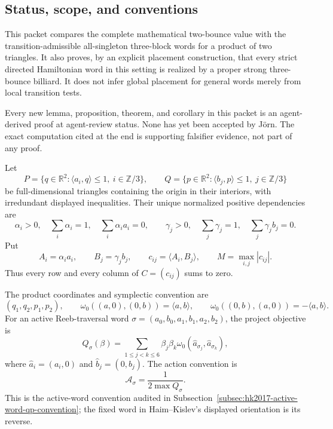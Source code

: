 %

\subsection{Status, scope, and conventions}
\label{subsec:product-triangle-bounce-status}

This packet compares the complete mathematical two-bounce value with the
transition-admissible all-singleton three-block words for a product of two
triangles.  It also proves, by an explicit placement construction, that every
strict directed Hamiltonian word in this setting is realized by a proper
strong three-bounce billiard.  It does not infer global placement for general
words merely from local transition tests.

\begin{unverified}
Every new lemma, proposition, theorem, and corollary in this packet is an
agent-derived proof at agent-review status.  None has yet been accepted by
Jörn.  The exact computation cited at the end is supporting falsifier evidence,
not part of any proof.
\end{unverified}

Let
\[
 P=\{q\in\mathbb R^2:\langle a_i,q\rangle\leq1,
                         \ i\in\mathbb Z/3\},\qquad
 Q=\{p\in\mathbb R^2:\langle b_j,p\rangle\leq1,
                         \ j\in\mathbb Z/3\}
\]
be full-dimensional triangles containing the origin in their interiors, with
irredundant displayed inequalities.  Their unique normalized positive
dependencies are
\begin{equation}
\label{eq:product-triangle-positive-dependencies}
 \alpha_i>0,\quad \sum_i\alpha_i=1,\quad
 \sum_i\alpha_i a_i=0,
 \qquad
 \gamma_j>0,\quad \sum_j\gamma_j=1,\quad
 \sum_j\gamma_j b_j=0.
\end{equation}
Put
\[
 A_i=\alpha_i a_i,\qquad B_j=\gamma_j b_j,
 \qquad c_{ij}=\langle A_i,B_j\rangle,
 \qquad M=\max_{i,j}|c_{ij}|.
\]
Thus every row and every column of \(C=(c_{ij})\) sums to zero.

The product coordinates and symplectic convention are
\[
 (q_1,q_2,p_1,p_2),\qquad
 \omega_0((a,0),(0,b))=\langle a,b\rangle,
 \qquad
 \omega_0((0,b),(a,0))=-\langle a,b\rangle.
\]
For an active Reeb-traversal word
\(
 \sigma=(a_0,b_0,a_1,b_1,a_2,b_2)
\), the project objective is
\begin{equation}
\label{eq:product-triangle-active-word-objective}
 Q_\sigma(\beta)=
 \sum_{1\leq j<k\leq6}\beta_j\beta_k
 \omega_0(\widehat a_{\sigma_j},\widehat a_{\sigma_k}),
\end{equation}
where \(\widehat a_i=(a_i,0)\) and
\(\widehat b_j=(0,b_j)\).  The action convention is
\begin{equation}
\label{eq:product-triangle-action-convention}
 \mathcal A_\sigma=\frac1{2\max Q_\sigma}.
\end{equation}
This is the active-word convention audited in
Subsection~\ref{subsec:hk2017-active-word-qp-convention}; the fixed word in
Haim--Kislev's displayed orientation is its reverse.

